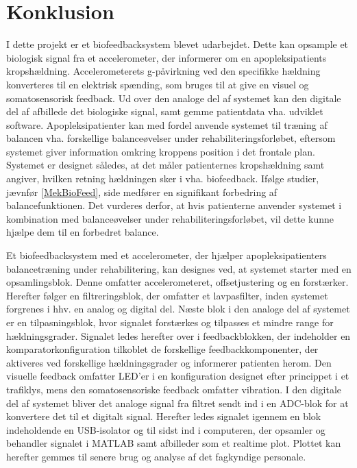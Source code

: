 \section{Konklusion}
I dette projekt er et biofeedbacksystem blevet udarbejdet. Dette kan opsample et biologisk signal fra et accelerometer, der informerer om en apopleksipatients kropshældning. Accelerometerets g-påvirkning ved den specifikke hældning konverteres til en elektrisk spænding, som bruges til at give en visuel og somatosensorisk feedback. Ud over den analoge del af systemet kan den digitale del af afbillede det biologiske signal, samt gemme patientdata vha. udviklet software. Apopleksipatienter kan med fordel anvende systemet til træning af balancen vha. forskellige balanceøvelser under rehabiliteringsforløbet, eftersom systemet giver information omkring kroppens position i det frontale plan. Systemet er designet således, at det måler patienternes kropshældning samt angiver, hvilken retning hældningen sker i vha. biofeedback. Ifølge studier, jævnfør \ref{MekBioFeed}, side \pageref{MekBioFeed} medfører en signifikant forbedring af balancefunktionen. Det vurderes derfor, at hvis patienterne anvender systemet i kombination med balanceøvelser under rehabiliteringsforløbet, vil dette kunne hjælpe dem til en forbedret balance. 

Et biofeedbacksystem med et accelerometer, der hjælper apopleksipatienters balancetræning under rehabilitering, kan designes ved, at systemet starter med en opsamlingsblok. Denne omfatter accelerometeret, offsetjustering og en forstærker. Herefter følger en filtreringsblok, der omfatter et lavpasfilter, inden systemet forgrenes i hhv. en analog og digital del. Næste blok i den analoge del af systemet er en tilpasningsblok, hvor signalet forstærkes og tilpasses et mindre range for hældningsgrader. Signalet ledes herefter over i feedbackblokken, der indeholder en komparatorkonfiguration tilkoblet de forskellige feedbackkomponenter, der aktiveres ved forskellige hældningsgrader og informerer patienten herom. Den visuelle feedback omfatter LED'er i en konfiguration designet efter princippet i et trafiklys, mens den somatosensoriske feedback omfatter vibration. 
I den digitale del af systemet bliver det analoge signal fra filtret sendt ind i en ADC-blok for at konvertere det til et digitalt signal. Herefter ledes signalet igennem en blok indeholdende en USB-isolator og til sidst ind i computeren, der opsamler og behandler signalet i MATLAB samt afbilleder som et realtime plot. Plottet kan herefter gemmes til senere brug og analyse af det fagkyndige personale.


